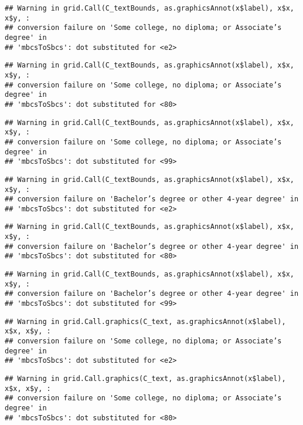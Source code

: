 \documentclass[
]{article}
\begin{document}
\begin{verbatim}
## Warning in grid.Call(C_textBounds, as.graphicsAnnot(x$label), x$x, x$y, :
## conversion failure on 'Some college, no diploma; or Associate’s degree' in
## 'mbcsToSbcs': dot substituted for <e2>
\end{verbatim}

\begin{verbatim}
## Warning in grid.Call(C_textBounds, as.graphicsAnnot(x$label), x$x, x$y, :
## conversion failure on 'Some college, no diploma; or Associate’s degree' in
## 'mbcsToSbcs': dot substituted for <80>
\end{verbatim}

\begin{verbatim}
## Warning in grid.Call(C_textBounds, as.graphicsAnnot(x$label), x$x, x$y, :
## conversion failure on 'Some college, no diploma; or Associate’s degree' in
## 'mbcsToSbcs': dot substituted for <99>
\end{verbatim}

\begin{verbatim}
## Warning in grid.Call(C_textBounds, as.graphicsAnnot(x$label), x$x, x$y, :
## conversion failure on 'Bachelor’s degree or other 4-year degree' in
## 'mbcsToSbcs': dot substituted for <e2>
\end{verbatim}

\begin{verbatim}
## Warning in grid.Call(C_textBounds, as.graphicsAnnot(x$label), x$x, x$y, :
## conversion failure on 'Bachelor’s degree or other 4-year degree' in
## 'mbcsToSbcs': dot substituted for <80>
\end{verbatim}

\begin{verbatim}
## Warning in grid.Call(C_textBounds, as.graphicsAnnot(x$label), x$x, x$y, :
## conversion failure on 'Bachelor’s degree or other 4-year degree' in
## 'mbcsToSbcs': dot substituted for <99>
\end{verbatim}

\begin{verbatim}
## Warning in grid.Call.graphics(C_text, as.graphicsAnnot(x$label), x$x, x$y, :
## conversion failure on 'Some college, no diploma; or Associate’s degree' in
## 'mbcsToSbcs': dot substituted for <e2>
\end{verbatim}

\begin{verbatim}
## Warning in grid.Call.graphics(C_text, as.graphicsAnnot(x$label), x$x, x$y, :
## conversion failure on 'Some college, no diploma; or Associate’s degree' in
## 'mbcsToSbcs': dot substituted for <80>
\end{verbatim}
\end{document}
